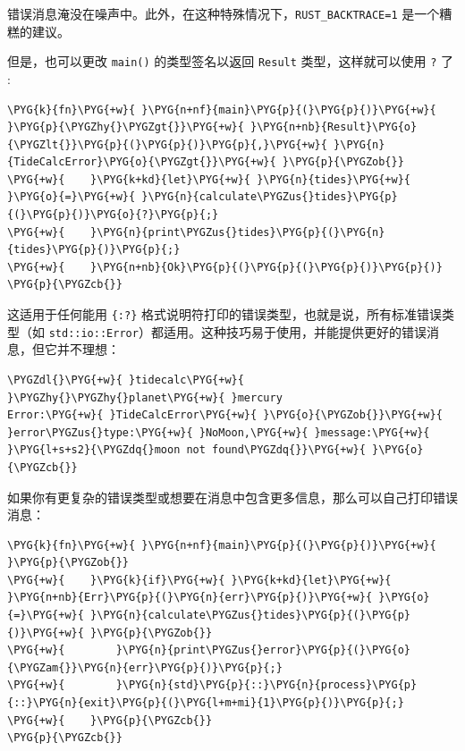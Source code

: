 错误消息淹没在噪声中。此外，在这种特殊情况下，\texttt{RUST\_BACKTRACE=1} 是一个糟糕的建议。

但是，也可以更改 \texttt{main()} 的类型签名以返回 \texttt{Result} 类型，这样就可以使用 \texttt{?} 了 :

\begin{Verbatim}[commandchars=\\\{\},breaklines=true,breakanywhere=true,fontsize=\codefont,xleftmargin=17bp]
\PYG{k}{fn}\PYG{+w}{ }\PYG{n+nf}{main}\PYG{p}{(}\PYG{p}{)}\PYG{+w}{ }\PYG{p}{\PYGZhy{}\PYGZgt{}}\PYG{+w}{ }\PYG{n+nb}{Result}\PYG{o}{\PYGZlt{}}\PYG{p}{(}\PYG{p}{)}\PYG{p}{,}\PYG{+w}{ }\PYG{n}{TideCalcError}\PYG{o}{\PYGZgt{}}\PYG{+w}{ }\PYG{p}{\PYGZob{}}
\PYG{+w}{    }\PYG{k+kd}{let}\PYG{+w}{ }\PYG{n}{tides}\PYG{+w}{ }\PYG{o}{=}\PYG{+w}{ }\PYG{n}{calculate\PYGZus{}tides}\PYG{p}{(}\PYG{p}{)}\PYG{o}{?}\PYG{p}{;}
\PYG{+w}{    }\PYG{n}{print\PYGZus{}tides}\PYG{p}{(}\PYG{n}{tides}\PYG{p}{)}\PYG{p}{;}
\PYG{+w}{    }\PYG{n+nb}{Ok}\PYG{p}{(}\PYG{p}{(}\PYG{p}{)}\PYG{p}{)}
\PYG{p}{\PYGZcb{}}
\end{Verbatim}

这适用于任何能用 \texttt{\{:?\}} 格式说明符打印的错误类型，也就是说，所有标准错误类型（如 \texttt{std::io::Error}）都适用。这种技巧易于使用，并能提供更好的错误消息，但它并不理想：

\begin{Verbatim}[commandchars=\\\{\},breaklines=true,breakanywhere=true,fontsize=\codefont,xleftmargin=17bp]
\PYGZdl{}\PYG{+w}{ }tidecalc\PYG{+w}{ }\PYGZhy{}\PYGZhy{}planet\PYG{+w}{ }mercury
Error:\PYG{+w}{ }TideCalcError\PYG{+w}{ }\PYG{o}{\PYGZob{}}\PYG{+w}{ }error\PYGZus{}type:\PYG{+w}{ }NoMoon,\PYG{+w}{ }message:\PYG{+w}{ }\PYG{l+s+s2}{\PYGZdq{}moon not found\PYGZdq{}}\PYG{+w}{ }\PYG{o}{\PYGZcb{}}
\end{Verbatim}

如果你有更复杂的错误类型或想要在消息中包含更多信息，那么可以自己打印错误消息：

\begin{Verbatim}[commandchars=\\\{\},breaklines=true,breakanywhere=true,fontsize=\codefont,xleftmargin=17bp]
\PYG{k}{fn}\PYG{+w}{ }\PYG{n+nf}{main}\PYG{p}{(}\PYG{p}{)}\PYG{+w}{ }\PYG{p}{\PYGZob{}}
\PYG{+w}{    }\PYG{k}{if}\PYG{+w}{ }\PYG{k+kd}{let}\PYG{+w}{ }\PYG{n+nb}{Err}\PYG{p}{(}\PYG{n}{err}\PYG{p}{)}\PYG{+w}{ }\PYG{o}{=}\PYG{+w}{ }\PYG{n}{calculate\PYGZus{}tides}\PYG{p}{(}\PYG{p}{)}\PYG{+w}{ }\PYG{p}{\PYGZob{}}
\PYG{+w}{        }\PYG{n}{print\PYGZus{}error}\PYG{p}{(}\PYG{o}{\PYGZam{}}\PYG{n}{err}\PYG{p}{)}\PYG{p}{;}
\PYG{+w}{        }\PYG{n}{std}\PYG{p}{::}\PYG{n}{process}\PYG{p}{::}\PYG{n}{exit}\PYG{p}{(}\PYG{l+m+mi}{1}\PYG{p}{)}\PYG{p}{;}
\PYG{+w}{    }\PYG{p}{\PYGZcb{}}
\PYG{p}{\PYGZcb{}}
\end{Verbatim}

